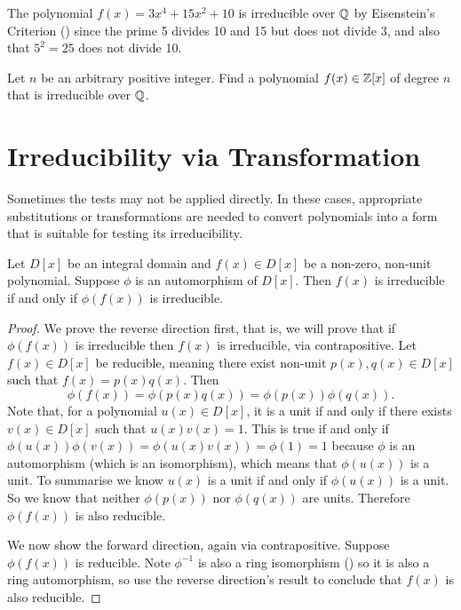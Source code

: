 \begin{example}
    The polynomial $f(x) = 3x^4 + 15x^2 + 10$ is irreducible over $\mathbb{Q}$ by Eisenstein's Criterion () since the prime 5 divides 10 and 15 but does not divide 3, and also that $5^2 = 25$ does not divide 10.
\end{example}

\begin{exercise}
    Let $n$ be an arbitrary positive integer. Find a polynomial $f(x) \in \mathbb{Z}[x]$ of degree $n$ that is irreducible over $\mathbb{Q}$.
\end{exercise}

\section{Irreducibility via Transformation}
Sometimes the tests may not be applied directly. In these cases, appropriate substitutions or transformations are needed to convert polynomials into a form that is suitable for testing its irreducibility.

\begin{theorem}\label{thrm-transformation-rule-for-irreducibility}
    Let $D[x]$ be an integral domain and $f(x) \in D[x]$ be a non-zero, non-unit polynomial. Suppose $\phi$ is an automorphism of $D[x]$. Then $f(x)$ is irreducible if and only if $\phi(f(x))$ is irreducible.
\end{theorem}
\begin{proof}
    We prove the reverse direction first, that is, we will prove that if $\phi(f(x))$ is irreducible then $f(x)$ is irreducible, via contrapositive. Let $f(x) \in D[x]$ be reducible, meaning there exist non-unit $p(x), q(x) \in D[x]$ such that $f(x) = p(x)q(x)$. Then
    \[
        \phi(f(x)) = \phi(p(x)q(x)) = \phi(p(x))\phi(q(x)).
    \]
    Note that, for a polynomial $u(x) \in D[x]$, it is a unit if and only if there exists $v(x) \in D[x]$ such that $u(x)v(x) = 1$. This is true if and only if $\phi(u(x))\phi(v(x))  = \phi(u(x)v(x)) = \phi(1) = 1$ because $\phi$ is an automorphism (which is an isomorphism), which means that $\phi(u(x))$ is a unit. To summarise we know $u(x)$ is a unit if and only if $\phi(u(x))$ is a unit. So we know that neither $\phi(p(x))$ nor $\phi(q(x))$ are units. Therefore $\phi(f(x))$ is also reducible.

    We now show the forward direction, again via contrapositive. Suppose $\phi(f(x))$ is reducible. Note $\phi^{-1}$ is also a ring isomorphism () so it is also a ring automorphism, so use the reverse direction's result to conclude that $f(x)$ is also reducible.
\end{proof}

